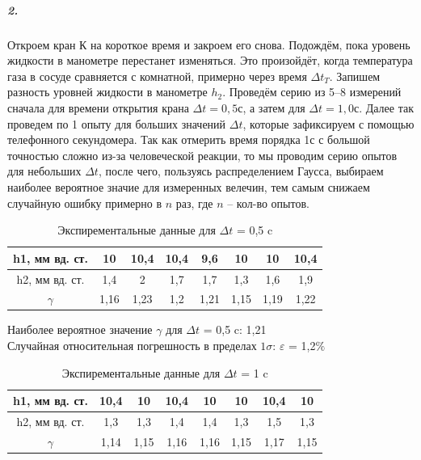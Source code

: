 \documentclass[a4paper,12pt]{article}
\begin{document}
\subparagraph*{2.} Откроем кран К на короткое время и закроем его снова. Подождём, пока уровень жидкости в манометре перестанет изменяться. Это произойдёт, когда температура газа в сосуде сравняется с комнатной, примерно через время $\Delta t_T$. Запишем разность уровней жидкости в манометре $h_2$. Проведём серию из 5--8 измерений сначала для времени открытия крана $\Delta t = 0,5 с$, а затем для $\Delta t = 1,0 с $. Далее так проведем по 1 опыту для больших значений $\Delta t$, которые зафиксируем с помощью телефонного секундомера. Так как отмерить время порядка 1с с большой точностью сложно из-за человеческой реакции, то мы проводим серию опытов для небольших $\Delta t$, после чего, пользуясь распределением Гаусса, выбираем наиболее вероятное значие для измеренных велечин, тем самым снижаем случайную ошибку примерно в $n$ раз, где $n$ -- кол-во опытов.


\begin{table}[h!]

	\begin{center}
	\caption{Экспирементальные данные для $\Delta t$ = 0,5 c}
	\begin{tabular}{|c|c|c|c|c|c|c|c|}
	\hline 
	h1, мм вд. ст. & 10 & 10,4 & 10,4 & 9,6 & 10 	& 10 & 10,4 \\ 
	\hline 
	h2, мм вд. ст. & 1,4 & 2 & 1,7 & 1,7 & 1,3 & 	1,6 & 1,9 \\ 
	\hline
	$\gamma$& 1,16 & 1,23 & 1,2 & 1,21 & 1,15 & 1,19 & 1,22 \\
	\hline 
	\end{tabular}
	
	\end{center}

\end{table}

Наиболее вероятное значение $\gamma$ для $\Delta t$ = 0,5 c: 1,21 \\
Случайная относительная погрешность в пределах $1 \sigma$: $\varepsilon$ = 1,2$\%$

\begin{table}[h!]

	\begin{center}
	
	\caption{Экспирементальные данные для $\Delta t$ = 1 c}
	
	\begin{tabular}{|c|c|c|c|c|c|c|c|}
	\hline 
	h1, мм вд. ст. & 10,4 & 10 & 10,4 & 10 & 10 & 10,4 & 10 \\ 
	\hline 
	h2, мм вд. ст. & 1,3 & 1,3 & 1,4 & 1,4 & 1,3 & 1,5 & 1,3 \\ 
	\hline 
	$\gamma$ & 1,14 & 1,15 & 1,16 & 1,16 & 1,15 & 1,17 & 1,15\\
	\hline
	\end{tabular}
	
	\end{center}

\end{table}
\end{document}
